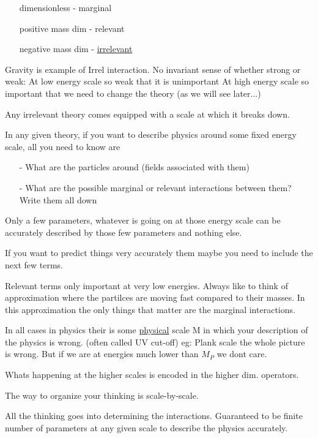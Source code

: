 {\begin{itemize}
\item[]dimensionless - marginal 
\item[]positive mass dim - relevant
\item[]negative mass dim - \underline{irrelevant}
\end{itemize}


Gravity is example of Irrel interaction.  
No invariant sense of whether strong or weak: 
At low energy scale so weak that it is unimportant
At high energy scale so important that we need to change the theory (as we will see later...)

Any irrelevant theory comes equipped with a scale at which it breaks down.

In any given theory, if you want to describe physics around some fixed energy scale, all you need to know are

\begin{itemize}
\item[-] What are the particles around (fields associated with them)
\item[-] What are the possible marginal or relevant interactions between them?  Write them all down
\end{itemize}

Only a few parameters, whatever is going on at those energy scale can be accurately described by those few parameters and nothing else.

If you want to predict things very accurately them maybe you need to include the next few terms. 

Relevant terms only important at very low energies. 
Always like to think of approximation where the partilces are moving fast compared to their masses. 
In this approximation the only things that matter are the marginal interactions. 

In all cases in physics their is some \underline{physical} scale M in which your description of the physics is wrong.
(often called UV cut-off)  eg: Plank scale the whole picture is wrong. 
But if we are at energies much lower than $M_{P}$ we dont care.

Whats happening at the higher scales is encoded in the higher dim. operators.

The way to organize your thinking is scale-by-scale.

All the thinking goes into determining the interactions. 
Guaranteed to be finite number of parameters at any given scale to describe the physics accurately. 

}
